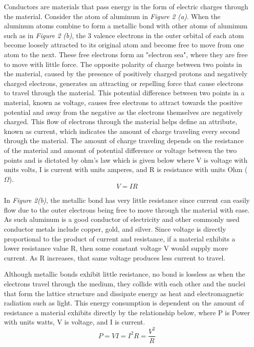 \documentclass[12pt]{article}
\begin{document}
Conductors are materials that pass energy in the form of electric charges through the material. Consider the atom of aluminum in \textit{Figure 2 (a)}. When the aluminum atoms combine to form a metallic bond with other atoms of aluminum such as in \textit{Figure 2 (b)}, the 3 valence electrons in the outer orbital of each atom become loosely attracted to its original atom and become free to move from one atom to the next. These free electrons form an "electron sea", where they are free to move with little force. The opposite polarity of charge between two points in the material, caused by the presence of positively charged protons and negatively charged electrons, generates an attracting or repelling force that cause electrons to travel through the material. This potential difference between two points in a material, known as voltage, causes free electrons to attract towards the positive potential and away from the negative as the electrons themselves are negatively charged. This flow of electrons through the material helps define an attribute, known as current, which indicates the amount of charge traveling every second through the material. The amount of charge traveling depends on the resistance of the material and amount of potential difference or voltage between the two points and is dictated by ohm's law which is given below where V is voltage with units volts, I is current with units amperes, and R is resistance with units Ohm ($\Omega$). $$V = IR$$ 

In \textit{Figure 2(b)}, the metallic bond has very little resistance since current can easily flow due to the outer electrons being free to move through the material with ease. As such aluminum is a good conductor of electricity and other commonly used conductor metals include copper, gold, and silver. Since voltage is directly proportional to the product of current and resistance, if a material exhibits a lower resistance value R, then some constant voltage V would supply more current. As R increases, that same voltage produces less current to travel. 

Although metallic bonds exhibit little resistance, no bond is lossless as when the electrons travel through the medium, they collide with each other and the nuclei that form the lattice structure and dissipate energy as heat and electromagnetic radiation such as light. This energy consumption is dependent on  the amount of resistance a material exhibits directly by the relationship below, where P is Power with units watts, V is voltage, and I is current. $$P = VI = I^{2}R = \frac{V^2}{R}$$ 
\end{document}
